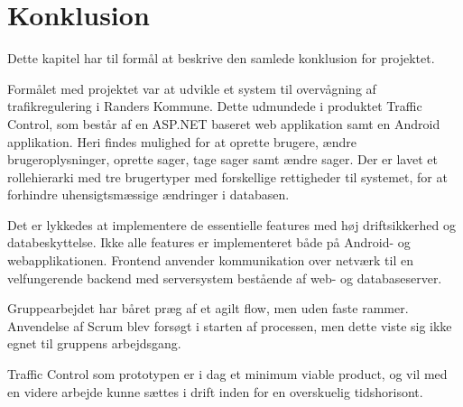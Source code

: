 \chapter{Konklusion}
Dette kapitel har til formål at beskrive den samlede 
konklusion for projektet. 

Formålet med projektet var at udvikle et system til overvågning af trafikregulering i Randers Kommune. Dette udmundede i produktet Traffic Control, som består af en ASP.NET baseret web applikation samt en Android applikation. Heri findes mulighed for at oprette brugere, ændre brugeroplysninger, oprette sager, tage sager samt ændre sager. Der er lavet et rollehierarki med tre brugertyper med forskellige rettigheder til systemet, for at forhindre uhensigtsmæssige ændringer i databasen. 

Det er lykkedes at implementere de essentielle features med høj driftsikkerhed og databeskyttelse. Ikke alle features er implementeret både på Android- og webapplikationen. 
Frontend anvender kommunikation over netværk til en velfungerende backend med serversystem bestående af web- og databaseserver.

Gruppearbejdet har båret præg af et agilt flow, men uden faste rammer. Anvendelse af Scrum blev forsøgt i starten af processen, men dette viste sig ikke egnet til gruppens arbejdsgang.

Traffic Control som prototypen er i dag et minimum viable product, og vil med en videre arbejde kunne sættes i drift inden for en overskuelig tidshorisont.
